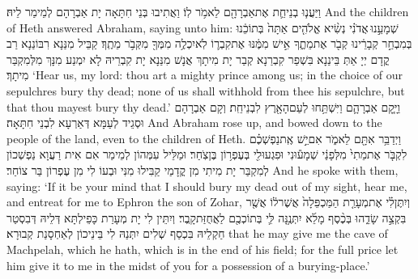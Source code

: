 {וַיַּעֲנ֧וּ בְנֵי\maqqaf חֵ֛ת אֶת\maqqaf אַבְרָהָ֖ם לֵאמֹ֥ר לֽוֹ׃}
{וַאֲתִיבוּ בְּנֵי חִתָּאָה יָת אַבְרָהָם לְמֵימַר לֵיהּ׃}
{And the children of Heth answered Abraham, saying unto him:}{}
{שְׁמָעֵ֣נוּ \legarmeh  אֲדֹנִ֗י נְשִׂ֨יא אֱלֹהִ֤ים אַתָּה֙ בְּתוֹכֵ֔נוּ בְּמִבְחַ֣ר קְבָרֵ֔ינוּ קְבֹ֖ר אֶת\maqqaf מֵתֶ֑ךָ אִ֣ישׁ מִמֶּ֔נּוּ אֶת\maqqaf קִבְר֛וֹ לֹֽא\maqqaf יִכְלֶ֥ה מִמְּךָ֖ מִקְּבֹ֥ר מֵתֶֽךָ׃}
{קַבֵּיל מִנַּנָא רִבּוֹנַנָא רַב קֳדָם יְיָ אַתְּ בֵּינַנָא בִּשְׁפַר קִבְרַנָא קְבַר יָת מִיתָךְ אֲנָשׁ מִנַּנָא יָת קִבְרֵיהּ לָא יִמְנַע מִנָּךְ מִלְּמִקְבַּר מִיתָךְ׃}
{‘Hear us, my lord: thou art a mighty prince among us; in the choice of our sepulchres bury thy dead; none of us shall withhold from thee his sepulchre, but that thou mayest bury thy dead.’}{}
{וַיָּ֧קׇם אַבְרָהָ֛ם וַיִּשְׁתַּ֥חוּ לְעַם\maqqaf הָאָ֖רֶץ לִבְנֵי\maqqaf חֵֽת׃}
{וְקָם אַבְרָהָם וּסְגֵיד לְעַמָּא דְּאַרְעָא לִבְנֵי חִתָּאָה׃}
{And Abraham rose up, and bowed down to the people of the land, even to the children of Heth.}{}
{וַיְדַבֵּ֥ר אִתָּ֖ם לֵאמֹ֑ר אִם\maqqaf יֵ֣שׁ אֶֽת\maqqaf נַפְשְׁכֶ֗ם לִקְבֹּ֤ר אֶת\maqqaf מֵתִי֙ מִלְּפָנַ֔י שְׁמָע֕וּנִי וּפִגְעוּ\maqqaf לִ֖י בְּעֶפְר֥וֹן בֶּן\maqqaf צֹֽחַר׃}
{וּמַלֵּיל עִמְּהוֹן לְמֵימַר אִם אִית רַעֲוָא נַפְשְׁכוֹן לְמִקְבַּר יָת מִיתִי מִן קֳדָמַי קַבִּילוּ מִנִּי וּבְעוֹ לִי מִן עֶפְרוֹן בַּר צוֹחַר׃}
{And he spoke with them, saying: ‘If it be your mind that I should bury my dead out of my sight, hear me, and entreat for me to Ephron the son of Zohar,}{}
{וְיִתֶּן\maqqaf לִ֗י אֶת\maqqaf מְעָרַ֤ת הַמַּכְפֵּלָה֙ אֲשֶׁר\maqqaf ל֔וֹ אֲשֶׁ֖ר בִּקְצֵ֣ה שָׂדֵ֑הוּ בְּכֶ֨סֶף מָלֵ֜א יִתְּנֶ֥נָּה לִּ֛י בְּתוֹכְכֶ֖ם לַאֲחֻזַּת\maqqaf קָֽבֶר׃}
{וְיִתֵּין לִי יָת מְעָרַת כָּפֵילְתָּא דְּלֵיהּ דְּבִסְטַר חַקְלֵיהּ בִּכְסַף שְׁלִים יִתְּנַהּ לִי בֵּינֵיכוֹן לְאַחְסָנַת קְבוּרָא׃}
{that he may give me the cave of Machpelah, which he hath, which is in the end of his field; for the full price let him give it to me in the midst of you for a possession of a burying-place.’}{}
